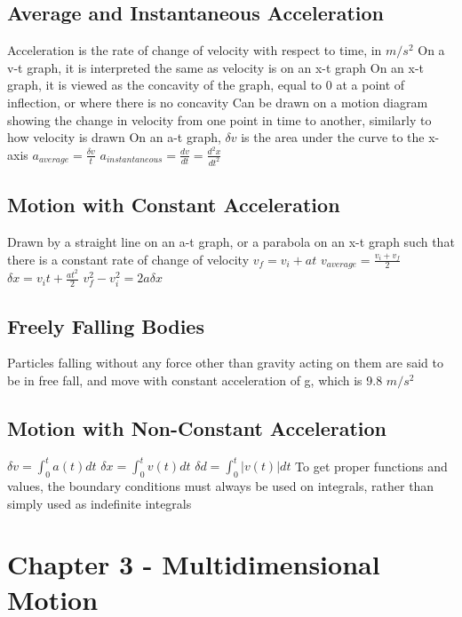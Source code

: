 \documentclass[11 pt, twoside]{article}
\newenvironment{outline*}
{
	\begin{outline}[enumerate]
	}
	{\end{outline}
}
\begin{document}
\subsection{Average and Instantaneous Acceleration}
\begin{outline*}
\1 Acceleration is the rate of change of velocity with respect to time, in $m/s^2$
\2 On a v-t graph, it is interpreted the same as velocity is on an x-t graph
\2 On an x-t graph, it is viewed as the concavity of the graph, equal to 0 at a point of inflection, or where there is no concavity
\2 Can be drawn on a motion diagram showing the change in velocity from one point in time to another, similarly to how velocity is drawn
\2 On an a-t graph, $\delta v$ is the area under the curve to the x-axis
\1 $a_{average} = \frac{\delta v}{t}$
\1 $a_{instantaneous} = \frac{dv}{dt} = \frac{d^2x}{dt^2}$
\end{outline*}
\subsection{Motion with Constant Acceleration}
\begin{outline*}
\1 Drawn by a straight line on an a-t graph, or a parabola on an x-t graph such that there is a constant rate of change of velocity
\1 $v_f = v_i + at$
\1 $v_{average} = \frac{v_i + v_f}{2}$
\1 $\delta x = v_it + \frac{at^2}{2}$
\1 $v_f^2 - v_i^2 = 2a\delta x$
\end{outline*}
\subsection{Freely Falling Bodies}
\begin{outline*}
\1 Particles falling without any force other than gravity acting on them are said to be in free fall, and move with constant acceleration of g, which is 9.8 $m/s^2$
\end{outline*}
\subsection{Motion with Non-Constant Acceleration}
\begin{outline*}
\1 $\delta v = \int_0^t a(t)dt$
\1 $\delta x = \int_0^t v(t)dt$
\1 $\delta d = \int_0^t |v(t)|dt$
\1 To get proper functions and values, the boundary conditions must always be used on integrals, rather than simply used as indefinite integrals
\end{outline*}
\section{Chapter 3 - Multidimensional Motion}
\end{document}
